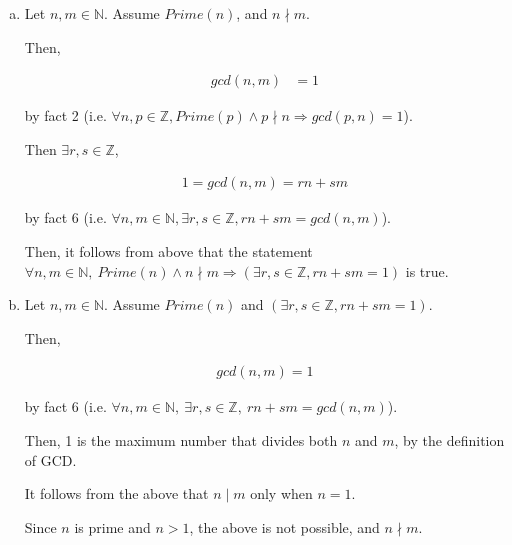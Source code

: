 \documentclass[12pt]{article}
\begin{document}
\begin{enumerate}[a.]
    \item

    Let $n,m \in \mathbb{N}$. Assume $Prime(n)$, and $n \nmid m$.

    \bigskip

    Then,

    \begin{align}
        gcd(n,m) &= 1
    \end{align}

    by fact 2 (i.e. $\forall n,p \in \mathbb{Z}, Prime(p) \land p \nmid n \Rightarrow
    gcd(p,n) = 1$).

    \bigskip

    Then $\exists r,s \in \mathbb{Z}$,

    \begin{align}
        1 = gcd(n,m) = rn + sm
    \end{align}

    by fact 6 (i.e. $\forall n,m \in \mathbb{N}, \exists r,s \in \mathbb{Z},
    rn+sm = gcd(n,m)$).

    \bigskip

    Then, it follows from above that the statement $\forall n,m \in \mathbb{N},\:
    Prime(n) \land n \nmid m \Rightarrow (\exists r,s \in \mathbb{Z}, rn+sm = 1)$ is
    true.

    \item

    Let $n,m \in \mathbb{N}$. Assume $Prime(n)$ and $(\exists r,s \in \mathbb{Z}, rn+sm = 1)$.

    \bigskip

    Then,

    \begin{align}
        gcd(n,m) = 1
    \end{align}

    by fact 6 (i.e. $\forall n,m \in \mathbb{N},\:\exists r,s \in \mathbb{Z},\: rn+sm = gcd(n,m)$).

    \bigskip

    Then, 1 is the maximum number that divides both $n$ and $m$, by the definition
    of GCD.

    \bigskip

    It follows from the above that $n \mid m$ only when $n = 1$.

    \bigskip

    Since $n$ is prime and $n > 1$, the above is not possible, and $n \nmid m$.


\end{enumerate}
\end{document}
